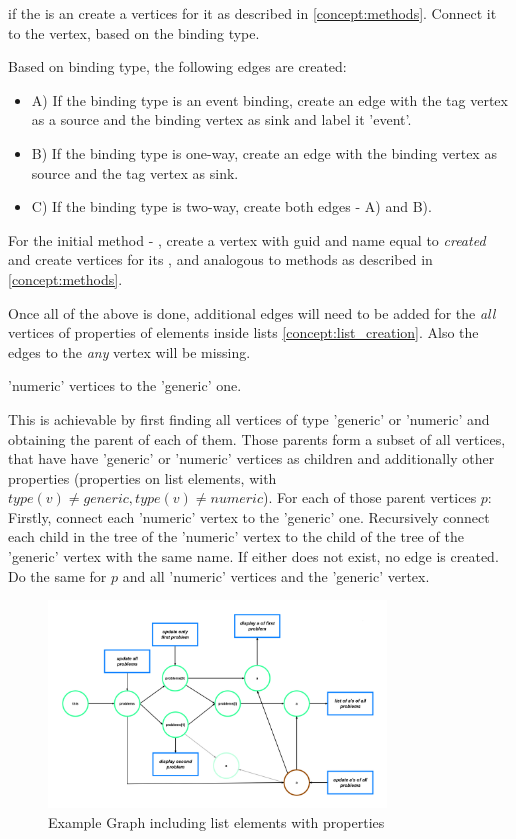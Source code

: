 if the  is an  create a vertices for it as described in \ref{concept:methods}. Connect it to the  vertex, based on the binding type.

Based on binding type, the following edges are created:
\begin{itemize}
    \item A) If the binding type is an event binding, create an 
edge with the tag vertex as a source and the binding vertex as sink and label it 'event'. 
\item B) If the binding type is one-way, create an edge with the binding vertex as source and the tag vertex as sink.
\item C) If the binding type is two-way, create both edges - A) and B).
\end{itemize}
For the initial method - , create a vertex with \gls{guid} and name equal to \textit{created} and create vertices for its ,  and  analogous to methods as described in \ref{concept:methods}. 


Once all of the above is done, additional edges will need to be added for the \textit{all} vertices of properties of elements inside lists \ref{concept:list_creation}. Also the edges to the \textit{any} vertex will be missing. 

'numeric' vertices to the 'generic' one. 

This is achievable by first finding all vertices of type 'generic' or 'numeric' and obtaining the parent of each of them. Those parents form a subset of all vertices, that have have 'generic' or 'numeric' vertices as children and additionally other properties (properties on list elements, with $type(v) \neq generic, type(v) \neq numeric$). 
For each of those parent vertices $p$:
Firstly, connect each 'numeric' vertex to the 'generic' one. Recursively connect each child in the tree of the 'numeric' vertex to the child of the tree of the 'generic' vertex with the same name. If either does not exist, no edge is created. Do the same for $p$ and all 'numeric' vertices and the 'generic' vertex.

\begin{figure}[H]
    \includegraphics[width=0.8\textwidth]{images/graph_complete_example.png}
     \caption{Example Graph including list elements with properties}
     \label{fig:graph_complete_example}
\end{figure}

